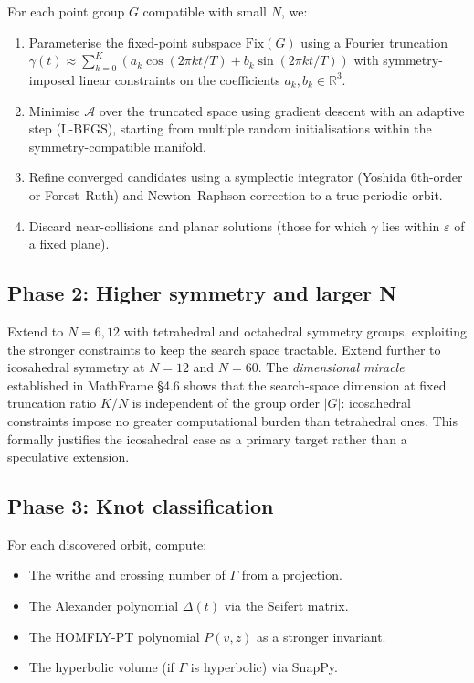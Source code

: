 \documentclass[12pt, a4paper]{article}
\theoremstyle{definition}
\newcommand{\R}{\mathbb{R}}
\newcommand{\Action}{\mathcal{A}}
\begin{document}
For each point group $G$ compatible with small $N$, we:
\begin{enumerate}[leftmargin=1.8em]
  \item Parameterise the fixed-point subspace $\mathrm{Fix}(G)$ using
        a Fourier truncation $\gamma(t) \approx \sum_{k=0}^{K} (a_k \cos(2\pi kt/T)
        + b_k \sin(2\pi kt/T))$ with symmetry-imposed linear constraints
        on the coefficients $a_k, b_k \in \R^3$.
  \item Minimise $\Action$ over the truncated space using gradient
        descent with an adaptive step (L-BFGS), starting from multiple
        random initialisations within the symmetry-compatible manifold.
  \item Refine converged candidates using a symplectic integrator
        (Yoshida 6th-order or Forest--Ruth) and Newton--Raphson
        correction to a true periodic orbit.
  \item Discard near-collisions and planar solutions (those for which
        $\gamma$ lies within $\varepsilon$ of a fixed plane).
\end{enumerate}

\subsection{Phase 2: Higher symmetry and larger N}

Extend to $N = 6, 12$ with tetrahedral and octahedral symmetry groups,
exploiting the stronger constraints to keep the search space tractable.
Extend further to icosahedral symmetry at $N = 12$ and $N = 60$.
The \emph{dimensional miracle} established in MathFrame \cite{MathFrame2026}
§4.6 shows that the search-space dimension at fixed truncation ratio
$K/N$ is independent of the group order $|G|$: icosahedral constraints
impose no greater computational burden than tetrahedral ones.
This formally justifies the icosahedral case as a primary target
rather than a speculative extension.

\subsection{Phase 3: Knot classification}

For each discovered orbit, compute:
\begin{itemize}[leftmargin=1.8em]
  \item The writhe and crossing number of $\Gamma$ from a projection.
  \item The Alexander polynomial $\Delta(t)$ via the Seifert matrix.
  \item The HOMFLY-PT polynomial $P(v, z)$ as a stronger invariant.
  \item The hyperbolic volume (if $\Gamma$ is hyperbolic) via SnapPy.
\end{itemize}
\end{document}
